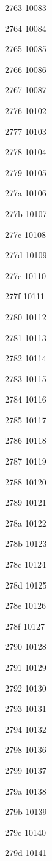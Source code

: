 \documentclass[11pt]{article}
\begin{document}
2763 10083 

2764 10084 

2765 10085 

2766 10086 

2767 10087 

2776 10102 

2777 10103 

2778 10104 

2779 10105 

277a 10106 

277b 10107 

277c 10108 

277d 10109 

277e 10110 

277f 10111 

2780 10112 

2781 10113 

2782 10114 

2783 10115 

2784 10116 

2785 10117 

2786 10118 

2787 10119 

2788 10120 

2789 10121 

278a 10122 

278b 10123 

278c 10124 

278d 10125 

278e 10126 

278f 10127 

2790 10128 

2791 10129 

2792 10130 

2793 10131 

2794 10132 

2798 10136 

2799 10137 

279a 10138 

279b 10139 

279c 10140 

279d 10141 
\end{document}
